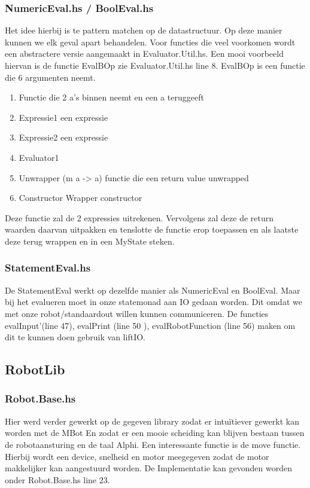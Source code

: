 \documentclass[a4paper,10pt]{article}
\begin{document}
    \subsubsection{NumericEval.hs / BoolEval.hs}
      Het idee hierbij is te pattern matchen op de datastructuur. Op deze manier kunnen we elk geval apart behandelen.
      Voor functies die veel voorkomen wordt een abstractere versie aangemaakt in Evaluator.Util.hs.
      Een mooi voorbeeld hiervan is de functie EvalBOp zie Evaluator.Util.hs line 8.
      EvalBOp is een functie die 6 argumenten neemt.
      \begin{enumerate}
        \item Functie die 2 a's binnen neemt en een a teruggeeft
        \item Expressie1 een expressie
        \item Expressie2 een expressie
        \item Evaluator1
        \item Unwrapper (m a -> a) functie die een return value unwrapped
        \item Constructor Wrapper constructor
      \end{enumerate}
      Deze functie zal de 2 expressies uitrekenen.
      Vervolgens zal deze de return waarden daarvan uitpakken en tenslotte
      de functie erop toepassen en als laatste deze terug wrappen en in een MyState steken.
      
      
    \subsubsection{StatementEval.hs}
    De StatementEval werkt op dezelfde manier als NumericEval en BoolEval.
    Maar bij het evalueren moet in onze statemonad aan IO gedaan worden.
    Dit omdat we met onze robot/standaardout willen kunnen communiceren.
    De functies evalInput'(line 47), evalPrint (line 50 ), evalRobotFunction (line 56) maken om dit te kunnen doen gebruik van liftIO.
  \subsection{RobotLib}
    \subsubsection{Robot.Base.hs}
    Hier werd verder gewerkt op de gegeven library zodat er intuïtiever gewerkt kan worden met de MBot
    En zodat er een mooie scheiding kan blijven bestaan tussen de robotaansturing en de taal Alphi.
    Een interessante functie is de move functie. Hierbij wordt een device, snelheid en motor meegegeven
    zodat de motor makkelijker kan aangestuurd worden.
    De Implementatie kan gevonden worden onder Robot.Base.hs line 23.
\end{document}
